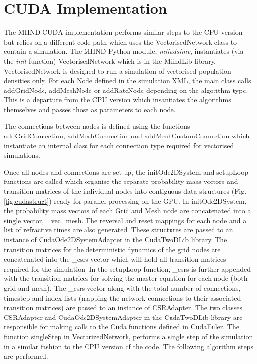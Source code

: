 \documentclass[utf8]{frontiers_suppmat} %
\begin{document}
\section{CUDA Implementation}
\label{cudaimplement}
The MIIND CUDA implementation performs similar steps to the CPU version but relies on a different code path which uses the VectorisedNetwork class to contain a simulation. The MIIND Python module, \textit{miindsimv}, instantiates (via the \textit{init} function) VectorisedNetwork which is in the MiindLib library. VectorisedNetwork is designed to run a simulation of vectorised population densities only. For each Node defined in the simulation XML, the main class calls addGridNode, addMeshNode or addRateNode depending on the algorithm type. This is a departure from the CPU version which insantiates the algorithms themselves and passes those as parameters to each node.

The connections between nodes is defined using the functions addGridConnection, addMeshConnection and addMeshCustomConnection which instantiate an internal class for each connection type required for vectorised simulations.

Once all nodes and connections are set up, the initOde2DSystem and setupLoop functions are called which organise the separate probability mass vectors and transition matrices of the individual nodes into contiguous data structures (Fig. \ref{fig:cudastruct}) ready for parallel processing on the GPU. In initOde2DSystem, the probability mass vectors of each Grid and Mesh node are concatenated into a single vector, \_vec\_mesh. The reversal and reset mappings for each node and a list of refractive times are also generated. These structures are passed to an instance of CudaOde2DSystemAdapter in the CudaTwoDLib library. The transition matrices for the deterministic dynamics of the grid nodes are concatenated into the \_csrs vector which will hold all transition matrices required for the simulation. In the setupLoop function, \_csrs is further appended with the transition matrices for solving the master equation for each node (both grid and mesh). The \_csrs vector along with the total number of connections, timestep and index lists (mapping the network connections to their associated transition matrices) are passed to an instance of CSRAdapter. The two classes CSRAdapter and CudaOde2DSystemAdapter in the CudaTwoDLib library are responsible for making calls to the Cuda functions defined in CudaEuler. The function singleStep in VectorizedNetwork, performs a single step of the simulation in a similar fashion to the CPU version of the code. The following algorithm steps are performed.\\
\end{document}
